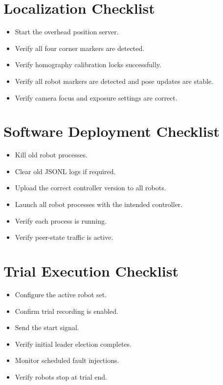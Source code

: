 \documentclass[a4paper,oneside,titlepage,11pt]{report}
\begin{document}
\section{Localization Checklist}
\begin{itemize}
    \item Start the overhead position server.
    \item Verify all four corner markers are detected.
    \item Verify homography calibration locks successfully.
    \item Verify all robot markers are detected and pose updates are stable.
    \item Verify camera focus and exposure settings are correct.
\end{itemize}

\section{Software Deployment Checklist}
\begin{itemize}
    \item Kill old robot processes.
    \item Clear old JSONL logs if required.
    \item Upload the correct controller version to all robots.
    \item Launch all robot processes with the intended controller.
    \item Verify each process is running.
    \item Verify peer-state traffic is active.
\end{itemize}

\section{Trial Execution Checklist}
\begin{itemize}
    \item Configure the active robot set.
    \item Confirm trial recording is enabled.
    \item Send the start signal.
    \item Verify initial leader election completes.
    \item Monitor scheduled fault injections.
    \item Verify robots stop at trial end.
\end{itemize}
\end{document}
